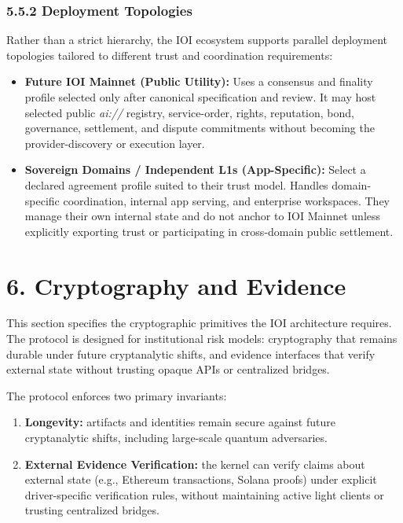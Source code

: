 \documentclass[
  11pt,
]{article}
\providecommand{\tightlist}{%
  \setlength{\itemsep}{0pt}\setlength{\parskip}{0pt}}
\begin{document}
\hypertarget{deployment-topologies}{%
\subsubsection{5.5.2 Deployment
Topologies}\label{deployment-topologies}}

Rather than a strict hierarchy, the IOI ecosystem supports parallel
deployment topologies tailored to different trust and coordination
requirements:

\begin{itemize}
\tightlist
\item
  \textbf{Future IOI Mainnet (Public Utility):} Uses a consensus and
  finality profile selected only after canonical specification and review.
  It may host selected public \emph{ai://} registry, service-order,
  rights, reputation, bond, governance, settlement, and dispute
  commitments without becoming the provider-discovery or execution layer.
\item
  \textbf{Sovereign Domains / Independent L1s (App-Specific):} Select a
  declared agreement profile suited to their trust model. Handles
  domain-specific coordination, internal app serving, and enterprise
  workspaces. They manage their own internal state and do not anchor to
  IOI Mainnet unless explicitly exporting trust or participating in
  cross-domain public settlement.
\end{itemize}

\hypertarget{cryptography-and-evidence}{%
\section{6. Cryptography and Evidence}\label{cryptography-and-evidence}}

This section specifies the cryptographic primitives the IOI architecture
requires. The protocol is designed for institutional risk models:
cryptography that remains durable under future cryptanalytic shifts, and
evidence interfaces that verify external state without trusting opaque
APIs or centralized bridges.

The protocol enforces two primary invariants:

\begin{enumerate}
\def\labelenumi{\arabic{enumi}.}
\item
  \textbf{Longevity: }artifacts and identities remain secure against
  future cryptanalytic shifts, including large-scale quantum
  adversaries.
\item
  \textbf{External Evidence Verification:} the kernel can verify claims
  about external state (e.g., Ethereum transactions, Solana proofs)
  under explicit driver-specific verification rules, without maintaining
  active light clients or trusting centralized bridges.
\end{enumerate}
\end{document}
